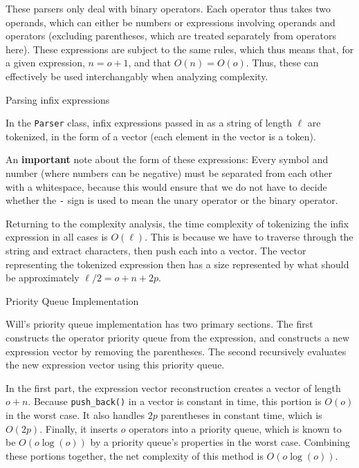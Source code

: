 \documentclass[11pt]{article}
\begin{document}
These parsers only deal with binary operators. Each operator thus takes two operands, which can either be numbers or expressions involving operands and operators (excluding parentheses, which are treated separately from operators here).
These expressions are subject to the same rules, which thus means that, for a given expression, $n=o+1$, and that $O(n)=O(o)$.
Thus, these can effectively be used interchangably when analyzing complexity.

\centerline{Parsing infix expressions}
In the \texttt{Parser} class, infix expressions passed in as a string of length $\ell$ are tokenized, in the form of a vector (each element in the vector is a token).

An \textbf{important} note about the form of these expressions: Every symbol and number (where numbers can be negative) must be separated from each other with a whitespace, because this would ensure that we do not have to decide whether the \texttt{-} sign is used to mean the unary operator or the binary operator.

Returning to the complexity analysis, the time complexity of tokenizing the infix expression in all cases is $O(\ell)$.
This is because we have to traverse through the string and extract characters, then push each into a vector.
The vector representing the tokenized expression then has a size represented by what should be approximately $\ell / 2 = o + n + 2p$.

\centerline{Priority Queue Implementation}
Will's priority queue implementation has two primary sections.
The first constructs the operator priority queue from the expression, and constructs a new expression vector by removing the parentheses.
The second recursively evaluates the new expression vector using this priority queue.

In the first part, the expression vector reconstruction creates a vector of length $o + n$.
Because \texttt{push\_back()} in a vector is constant in time, this portion is $O(o)$ in the worst case.
It also handles $2p$ parentheses in constant time, which is $O(2p)$.
Finally, it inserts $o$ operators into a priority queue, which is known to be $O(o\log(o))$ by a priority queue's properties in the worst case.
Combining these portions together, the net complexity of this method is $O(o\log(o))$.
\end{document}
